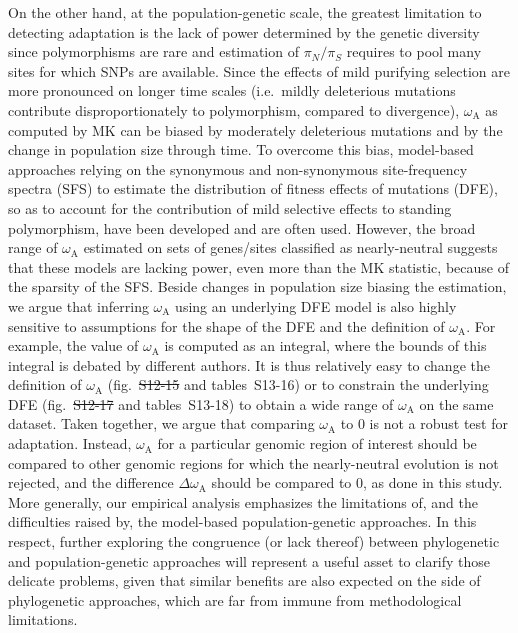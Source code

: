 \documentclass{article}
\newcommand{\rateApop}{\omega_{\mathrm{A}}}
\newcommand{\pn}{\pi_N}
\newcommand{\ps}{\pi_S}
\newcommand{\pnps}{\pn / \ps}
\providecommand{\DIFaddtex}[1]{{\protect\color{blue}\uwave{#1}}} %
\providecommand{\DIFdeltex}[1]{{\protect\color{red}\sout{#1}}}                      %
\providecommand{\DIFaddbegin}{} %
\providecommand{\DIFaddend}{} %
\providecommand{\DIFdelbegin}{} %
\providecommand{\DIFdelend}{} %
\providecommand{\DIFadd}[1]{\texorpdfstring{\DIFaddtex{#1}}{#1}} %
\providecommand{\DIFdel}[1]{\texorpdfstring{\DIFdeltex{#1}}{}} %
\newcommand{\DIFscaledelfig}{0.5}
\newlength{\DIFdelgraphicswidth} %
\newlength{\DIFdelgraphicsheight} %
\newcommand{\DIFaddincludegraphics}[2][]{{\color{blue}\fbox{\DIFOincludegraphics[#1]{#2}}}} %
\newcommand{\DIFdelincludegraphics}[2][]{%
\sbox{\DIFdelgraphicsbox}{\DIFOincludegraphics[#1]{#2}}%
\settoboxwidth{\DIFdelgraphicswidth}{\DIFdelgraphicsbox} %
\settoboxtotalheight{\DIFdelgraphicsheight}{\DIFdelgraphicsbox} %
\scalebox{\DIFscaledelfig}{%
\parbox[b]{\DIFdelgraphicswidth}{\usebox{\DIFdelgraphicsbox}\\[-\baselineskip] \rule{\DIFdelgraphicswidth}{0em}}\llap{\resizebox{\DIFdelgraphicswidth}{\DIFdelgraphicsheight}{%
\setlength{\unitlength}{\DIFdelgraphicswidth}%
\begin{picture}(1,1)%
\thicklines\linethickness{2pt} %
{\color[rgb]{1,0,0}\put(0,0){\framebox(1,1){}}}%
{\color[rgb]{1,0,0}\put(0,0){\line( 1,1){1}}}%
{\color[rgb]{1,0,0}\put(0,1){\line(1,-1){1}}}%
\end{picture}%
}\hspace*{3pt}}} %
} %
\DeclareRobustCommand{\DIFaddbegin}{\DIFOaddbegin \let\includegraphics\DIFaddincludegraphics} %
\DeclareRobustCommand{\DIFaddend}{\DIFOaddend \let\includegraphics\DIFOincludegraphics} %
\DeclareRobustCommand{\DIFdelbegin}{\DIFOdelbegin \let\includegraphics\DIFdelincludegraphics} %
\DeclareRobustCommand{\DIFdelend}{\DIFOaddend \let\includegraphics\DIFOincludegraphics} %
\begin{document}
    On the other hand, at the population-genetic scale, the greatest limitation to detecting adaptation is the lack of power determined by the genetic diversity since polymorphisms are rare and estimation of $\pnps$ requires to pool many sites for which SNPs are available.
    Since the effects of mild purifying selection are more pronounced on longer time scales (i.e.~mildly deleterious mutations contribute disproportionately to polymorphism, compared to divergence), $\rateApop$ as computed by MK can be biased by moderately deleterious mutations\cite{eyre-walker_quantifying_2002, ho_time_2005} and by the change in population size through time\cite{eyre-walker_changing_2002}.
    To overcome this bias, model-based approaches relying on the synonymous and non-synonymous site-frequency spectra (SFS) to estimate the distribution of fitness effects of mutations (DFE), so as to account for the contribution of mild selective effects to standing polymorphism, have been developed\cite{eyre-walker_estimating_2009, tataru_polydfe_2020} and are often used\cite{galtier_adaptive_2016, moutinho_variation_2019}.
    However, the broad range of $\rateApop$ estimated on sets of genes/sites classified as nearly-neutral suggests that these models are lacking power, even more than the MK statistic, because of the sparsity of the SFS.
    Beside changes in population size biasing the estimation\cite{rousselle_overestimation_2018}, we argue that inferring $\rateApop$ using an underlying DFE model is also highly sensitive to assumptions for the shape of the DFE and the definition of $\rateApop$.
    For example, the value of $\rateApop$ is computed as an integral, where the bounds of this integral is debated by different authors\cite{galtier_adaptive_2016, tataru_polydfev2_2019}.
    It is thus relatively easy to change the definition of $\rateApop$ (fig.~\DIFdelbegin \DIFdel{S12-15 }\DIFdelend \DIFaddbegin \DIFadd{S13-16 }\DIFaddend and tables~S13-16) or to constrain the underlying DFE (fig.~\DIFdelbegin \DIFdel{S12-17 }\DIFdelend \DIFaddbegin \DIFadd{S13-18 }\DIFaddend and tables~S13-18) to obtain a wide range of $\rateApop$ on the same dataset.
    Taken together, we argue that comparing $\rateApop$ to 0 is not a robust test for adaptation.
    Instead, $\rateApop$ for a particular genomic region of interest should be compared to other genomic regions for which the nearly-neutral evolution is not rejected, and the difference $\Delta \rateApop$ should be compared to 0, as done in this study.
    More generally, our empirical analysis emphasizes the limitations of, and the difficulties raised by, the model-based population-genetic approaches.
    In this respect, further exploring the congruence (or lack thereof) between phylogenetic and population-genetic approaches will represent a useful asset to clarify those delicate problems, given that similar benefits are also expected on the side of phylogenetic approaches, which are far from immune from methodological limitations.
\end{document}
